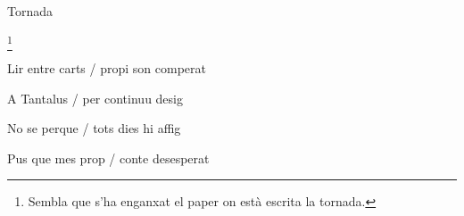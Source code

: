 \documentclass[12pt]{article}
\begin{document}
\begin{estrofaExtra}%




\begin{tornada}

Tornada

\end{tornada}\footnote{Sembla que s'ha enganxat el paper on est\`{a} escrita
la tornada.}


\end{estrofaExtra}


\begin{estrofa}

 Lir entre carts / propi son comperat

 A Tantalus / per continuu desig

 No se perque / tots dies hi affig

 Pus que mes prop / conte desesperat

\end{estrofa}
\end{document}
